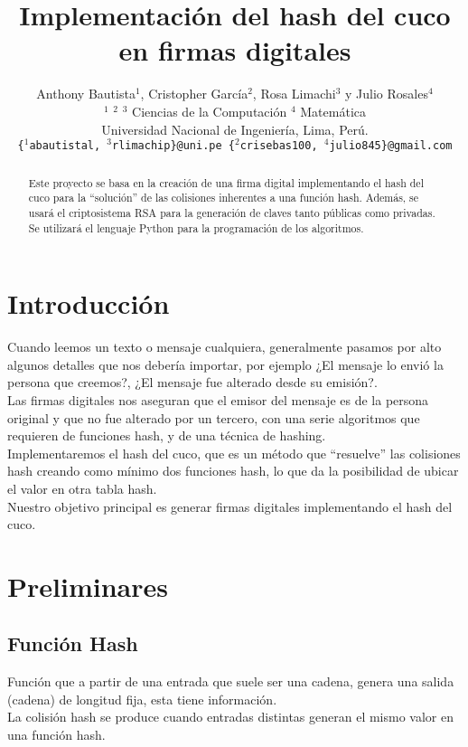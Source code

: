 \documentclass[final,a4paper,twocolumn,romanappendices]{IEEEtran}
\title{Implementación del hash del cuco en firmas digitales}
\author{Anthony Bautista$^{1}$, Cristopher García$^{2}$, Rosa Limachi$^{3}$ y Julio Rosales$^{4}$\\
\small{$^{1}$ $^{2}$ $^{3}$ Ciencias de la Computación $^{4}$ Matemática\\}
\small{Universidad Nacional de Ingeniería, Lima, Perú.\\}
\small{\texttt{\{$^{1}$abautistal, $^{3}$rlimachip\}@uni.pe \{$^{2}$crisebas100, $^{4}$julio845\}@gmail.com}}
}
\begin{document}
\maketitle

\begin{abstract}
Este proyecto se basa en la creación de una firma digital implementando el hash del cuco para la “solución” de las colisiones inherentes a una función hash. Además, se usará el criptosistema RSA para la generación de claves tanto públicas como privadas. Se utilizará el lenguaje Python para la programación de los algoritmos. 






\end{abstract}

\section{Introducción}

Cuando leemos un texto o mensaje cualquiera, generalmente pasamos por alto algunos detalles que nos debería importar, por ejemplo ¿El mensaje lo envió la persona que creemos?, ¿El mensaje fue alterado desde su emisión?.
\\
Las firmas digitales nos aseguran que el emisor del mensaje es de la persona original y que no fue alterado por un tercero, con una serie algoritmos que requieren de funciones hash, y de una técnica de hashing.
\\
Implementaremos el hash del cuco, que es un método que “resuelve” las colisiones hash creando como mínimo dos funciones hash, lo que da la posibilidad de ubicar el valor en otra tabla hash.
\\
Nuestro objetivo principal es generar firmas digitales implementando el hash del cuco.

\section{Preliminares}
\subsection{Función Hash}
Función que a partir de una entrada que suele ser una cadena, genera una salida (cadena) de longitud fija, esta tiene información.\\
La colisión hash se produce cuando entradas distintas generan el mismo valor en una función hash.
\end{document}
